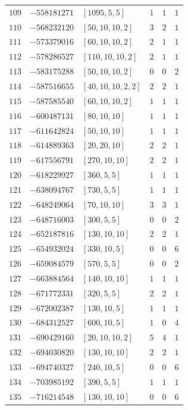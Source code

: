\documentclass[11pt]{article}
\begin{document}
\begin{center}
\begin{longtable}{r r l c c c}
$109$ & $-558181271$ & $[1095,5,5]$ & $1$ & $1$ & $1$\\
$110$ & $-568232120$ & $[50,10,10,2]$ & $3$ & $2$ & $1$\\
$111$ & $-573379016$ & $[60,10,10,2]$ & $2$ & $1$ & $1$\\
$112$ & $-578286527$ & $[110,10,10,2]$ & $2$ & $1$ & $1$\\
$113$ & $-583175288$ & $[50,10,10,2]$ & $0$ & $0$ & $2$\\
$114$ & $-587516655$ & $[40,10,10,2,2]$ & $2$ & $2$ & $1$\\
$115$ & $-587585540$ & $[60,10,10,2]$ & $1$ & $1$ & $1$\\
$116$ & $-600487131$ & $[80,10,10]$ & $1$ & $1$ & $1$\\
$117$ & $-611642824$ & $[50,10,10]$ & $1$ & $1$ & $1$\\
$118$ & $-614889363$ & $[20,20,10]$ & $2$ & $2$ & $1$\\
$119$ & $-617556791$ & $[270,10,10]$ & $2$ & $2$ & $1$\\
$120$ & $-618229927$ & $[360,5,5]$ & $1$ & $1$ & $1$\\
$121$ & $-638094767$ & $[730,5,5]$ & $1$ & $1$ & $1$\\
$122$ & $-648249064$ & $[70,10,10]$ & $3$ & $3$ & $1$\\
$123$ & $-648716003$ & $[300,5,5]$ & $0$ & $0$ & $2$\\
$124$ & $-652187816$ & $[130,10,10]$ & $2$ & $2$ & $1$\\
$125$ & $-654932024$ & $[330,10,5]$ & $0$ & $0$ & $6$\\
$126$ & $-659084579$ & $[570,5,5]$ & $0$ & $0$ & $2$\\
$127$ & $-663884564$ & $[140,10,10]$ & $1$ & $1$ & $1$\\
$128$ & $-671772331$ & $[320,5,5]$ & $2$ & $2$ & $1$\\
$129$ & $-672002387$ & $[130,10,5]$ & $1$ & $1$ & $1$\\
$130$ & $-684312527$ & $[600,10,5]$ & $1$ & $0$ & $4$\\
$131$ & $-690429160$ & $[20,10,10,2]$ & $5$ & $4$ & $1$\\
$132$ & $-694030820$ & $[130,10,10]$ & $2$ & $2$ & $1$\\
$133$ & $-694740327$ & $[240,10,5]$ & $0$ & $0$ & $6$\\
$134$ & $-703985192$ & $[390,5,5]$ & $1$ & $1$ & $1$\\
$135$ & $-716214548$ & $[130,10,10]$ & $0$ & $0$ & $6$\\

\end{longtable}
\end{center}
\end{document}
